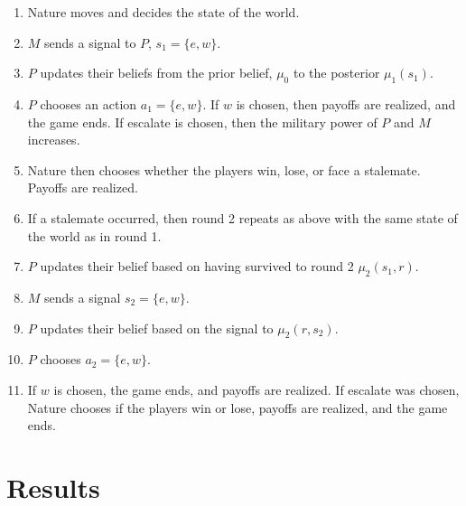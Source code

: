 \documentclass[
  12pt,
]{article}
\providecommand{\tightlist}{%
  \setlength{\itemsep}{0pt}\setlength{\parskip}{0pt}}\usepackage{longtable,booktabs,array}
\theoremstyle{plain}
\theoremstyle{plain}
\theoremstyle{remark}
\begin{document}
\begin{enumerate}
\def\labelenumi{\arabic{enumi}.}
\tightlist
\item
  Nature moves and decides the state of the world.
\item
  \(M\) sends a signal to \(P\), \(s_1 = \{e, w\}\).
\item
  \(P\) updates their beliefs from the prior belief, \(\mu_0\) to the
  posterior \(\mu_1(s_1)\).
\item
  \(P\) chooses an action \(a_1= \{e, w\}\). If \(w\) is chosen, then
  payoffs are realized, and the game ends. If escalate is chosen, then
  the military power of \(P\) and \(M\) increases.
\item
  Nature then chooses whether the players win, lose, or face a
  stalemate. Payoffs are realized.
\item
  If a stalemate occurred, then round 2 repeats as above with the same
  state of the world as in round 1.
\item
  \(P\) updates their belief based on having survived to round 2
  \(\mu_2(s_1, r)\).
\item
  \(M\) sends a signal \(s_2 = \{e, w\}\).
\item
  \(P\) updates their belief based on the signal to \(\mu_2(r, s_2)\).
\item
  \(P\) chooses \(a_2= \{e, w\}\).
\item
  If \(w\) is chosen, the game ends, and payoffs are realized. If
  escalate was chosen, Nature chooses if the players win or lose,
  payoffs are realized, and the game ends.
\end{enumerate}

\section{Results}\label{results}
\end{document}
